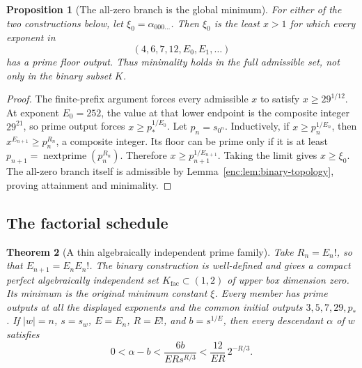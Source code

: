 \documentclass[11pt,a4paper]{article}
\newtheorem{theorem}{Theorem}[section]
\newtheorem{proposition}[theorem]{Proposition}
\theoremstyle{definition}
\theoremstyle{remark}
\numberwithin{equation}{section}
\begin{document}
\begin{proposition}[The all-zero branch is the global minimum]
\label{enc:prop:zero-branch-minimum}
For either of the two constructions below, let
$\xi_0=\alpha_{000\ldots}$.  Then $\xi_0$ is the least $x>1$ for which
every exponent in
\[
 (4,6,7,12,E_0,E_1,\ldots)
\]
has a prime floor output.  Thus minimality holds in the full admissible
set, not only in the binary subset $K$.
\end{proposition}

\begin{proof}
The finite-prefix argument forces every admissible $x$ to satisfy
$x\ge29^{1/12}$.  At exponent $E_0=252$, the value at that lower endpoint
is the composite integer $29^{21}$, so prime output forces
$x\ge p_*^{1/E_0}$.  Let $p_n=s_{0^n}$.  Inductively, if
$x\ge p_n^{1/E_n}$, then
$x^{E_{n+1}}\ge p_n^{R_n}$, a composite integer.  Its floor can be prime
only if it is at least
$p_{n+1}=\operatorname{nextprime}(p_n^{R_n})$.  Therefore
$x\ge p_{n+1}^{1/E_{n+1}}$.  Taking the limit gives $x\ge\xi_0$.
The all-zero branch itself is admissible by
Lemma~\ref{enc:lem:binary-topology}, proving attainment and minimality.
\end{proof}

\subsection{The factorial schedule}

\begin{theorem}[A thin algebraically independent prime family]
\label{enc:thm:factorial-cantor}
Take $R_n=E_n!$, so that $E_{n+1}=E_nE_n!$.  The binary construction is
well-defined and gives a compact perfect algebraically independent set
$K_{\mathrm{fac}}\subset(1,2)$ of upper box dimension zero.  Its minimum is
the original minimum constant $\xi$.  Every member has prime outputs at
all the displayed exponents and the common initial outputs
$3,5,7,29,p_*$.  If $|w|=n$, $s=s_w$, $E=E_n$, $R=E!$, and
$b=s^{1/E}$, then every descendant $\alpha$ of $w$ satisfies
\begin{equation}
\label{enc:eq:factorial-uniform-error}
 0<\alpha-b<\frac{6b}{ERs^{R/3}}
 <\frac{12}{ER}\,2^{-R/3}.
\end{equation}
\end{theorem}
\end{document}
